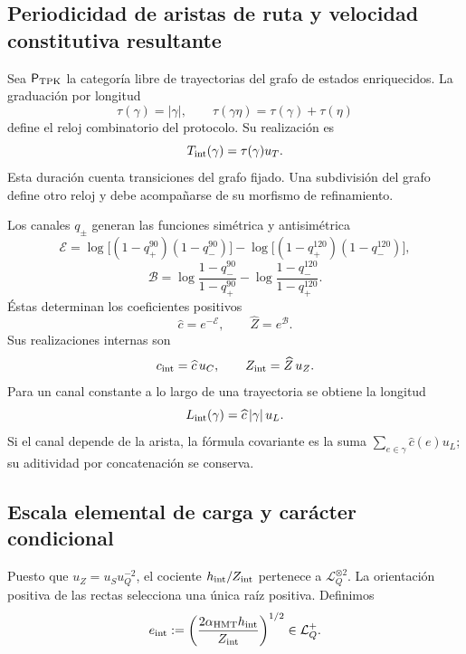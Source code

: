 \subsection{Periodicidad de aristas de ruta y velocidad constitutiva resultante}

Sea \(\mathsf P_{\rm TPK}\) la categoría libre de trayectorias del grafo de
estados enriquecidos. La graduación por longitud
\[
 \tau(\gamma)=|\gamma|,
 \qquad
 \tau(\gamma\eta)=\tau(\gamma)+\tau(\eta)
\]
define el reloj combinatorio del protocolo. Su realización es
\[
 T_{\rm int}(\gamma)=\tau(\gamma)u_T.
\]
Esta duración cuenta transiciones del grafo fijado. Una subdivisión del grafo
define otro reloj y debe acompañarse de su morfismo de refinamiento.

Los canales \(q_\pm\) generan las funciones simétrica y antisimétrica
\[
 \mathcal E=
 \log\!\bigl[(1-q_+^{90})(1-q_-^{90})\bigr]
 -\log\!\bigl[(1-q_+^{120})(1-q_-^{120})\bigr],
\]
\[
 \mathcal B=
 \log\!\frac{1-q_-^{90}}{1-q_+^{90}}
 -\log\!\frac{1-q_-^{120}}{1-q_+^{120}}.
\]
Éstas determinan
los coeficientes positivos
\[
 \widehat c=e^{-\mathcal E},
 \qquad \widehat Z=e^{\mathcal B}.
\]
Sus realizaciones internas son
\begin{equation}
 c_{\rm int}=\widehat c\,u_C,
 \qquad Z_{\rm int}=\widehat Z\,u_Z.
 \label{eq:cZ-internos}
\end{equation}
Para un canal constante a lo largo de una trayectoria se obtiene la longitud
\begin{equation}
 L_{\rm int}(\gamma)
 =\widehat c\,|\gamma|\,u_L.
 \label{eq:longitud-ruta}
\end{equation}
Si el canal depende de la arista, la fórmula covariante es la suma
\(\sum_{e\in\gamma}\widehat c(e)u_L\); su aditividad por concatenación se
conserva.

\subsection{Escala elemental de carga y carácter condicional}

Puesto que \(u_Z=u_Su_Q^{-2}\), el cociente
\(h_{\rm int}/Z_{\rm int}\) pertenece a \(\mathcal L_Q^{\otimes2}\).
La orientación positiva de las rectas selecciona una única raíz positiva.
Definimos
\begin{equation}
 e_{\rm int}
 :=\left(\frac{2\alpha_{\rm HMT}h_{\rm int}}
 {Z_{\rm int}}\right)^{1/2}\in\mathcal L_Q^+.
 \label{eq:carga-interna}
\end{equation}

